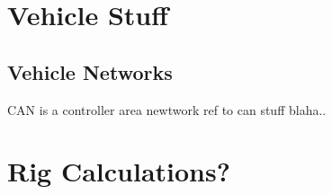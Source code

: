 \chapter{Vehicle Stuff} \label{appA}

\section{Vehicle Networks}
CAN is a controller area newtwork ref to can stuff blaha..

\chapter{Rig Calculations?} \label{appB}